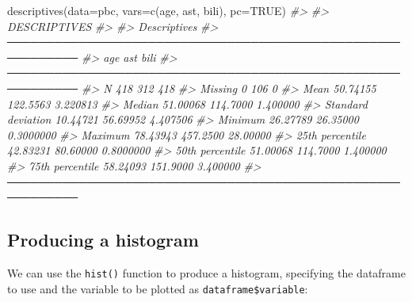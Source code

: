 \documentclass[
]{memoir}
\newenvironment{Shaded}{\begin{snugshade}}{\end{snugshade}}
\newcommand{\AttributeTok}[1]{\textcolor[rgb]{0.77,0.63,0.00}{#1}}
\newcommand{\CommentTok}[1]{\textcolor[rgb]{0.56,0.35,0.01}{\textit{#1}}}
\newcommand{\ConstantTok}[1]{\textcolor[rgb]{0.00,0.00,0.00}{#1}}
\newcommand{\FunctionTok}[1]{\textcolor[rgb]{0.00,0.00,0.00}{#1}}
\newcommand{\NormalTok}[1]{#1}
\newcommand{\SpecialCharTok}[1]{\textcolor[rgb]{0.00,0.00,0.00}{#1}}
\begin{document}
\begin{Shaded}
\begin{Highlighting}[]
\FunctionTok{descriptives}\NormalTok{(}\AttributeTok{data=}\NormalTok{pbc, }\AttributeTok{vars=}\FunctionTok{c}\NormalTok{(age, ast, bili), }\AttributeTok{pc=}\ConstantTok{TRUE}\NormalTok{)}
\CommentTok{\#\textgreater{} }
\CommentTok{\#\textgreater{}  DESCRIPTIVES}
\CommentTok{\#\textgreater{} }
\CommentTok{\#\textgreater{}  Descriptives                                                }
\CommentTok{\#\textgreater{}  ─────────────────────────────────────────────────────────── }
\CommentTok{\#\textgreater{}                          age         ast         bili        }
\CommentTok{\#\textgreater{}  ─────────────────────────────────────────────────────────── }
\CommentTok{\#\textgreater{}    N                          418         312          418   }
\CommentTok{\#\textgreater{}    Missing                      0         106            0   }
\CommentTok{\#\textgreater{}    Mean                  50.74155    122.5563     3.220813   }
\CommentTok{\#\textgreater{}    Median                51.00068    114.7000     1.400000   }
\CommentTok{\#\textgreater{}    Standard deviation    10.44721    56.69952     4.407506   }
\CommentTok{\#\textgreater{}    Minimum               26.27789    26.35000    0.3000000   }
\CommentTok{\#\textgreater{}    Maximum               78.43943    457.2500     28.00000   }
\CommentTok{\#\textgreater{}    25th percentile       42.83231    80.60000    0.8000000   }
\CommentTok{\#\textgreater{}    50th percentile       51.00068    114.7000     1.400000   }
\CommentTok{\#\textgreater{}    75th percentile       58.24093    151.9000     3.400000   }
\CommentTok{\#\textgreater{}  ───────────────────────────────────────────────────────────}
\end{Highlighting}
\end{Shaded}

\hypertarget{producing-a-histogram}{%
\subsection{Producing a histogram}\label{producing-a-histogram}}

We can use the \texttt{hist()} function to produce a histogram, specifying the dataframe to use and the variable to be plotted as \texttt{dataframe\$variable}:

\begin{Shaded}
\end{Shaded}
\end{document}
